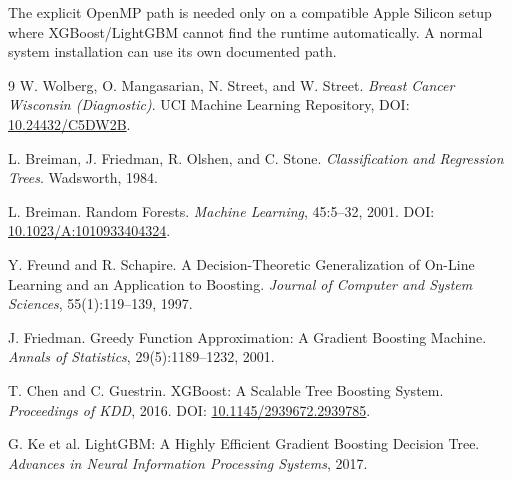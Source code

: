 \documentclass[11pt]{article}
\begin{document}
The explicit OpenMP path is needed only on a compatible Apple Silicon setup
where XGBoost/LightGBM cannot find the runtime automatically. A normal system
installation can use its own documented path.

\begin{thebibliography}{9}
W. Wolberg, O. Mangasarian, N. Street, and W. Street.
\emph{Breast Cancer Wisconsin (Diagnostic)}. UCI Machine Learning Repository,
DOI: \href{https://doi.org/10.24432/C5DW2B}{10.24432/C5DW2B}.

L. Breiman, J. Friedman, R. Olshen, and C. Stone.
\emph{Classification and Regression Trees}. Wadsworth, 1984.

L. Breiman. Random Forests. \emph{Machine Learning}, 45:5--32, 2001.
DOI: \href{https://doi.org/10.1023/A:1010933404324}{10.1023/A:1010933404324}.

Y. Freund and R. Schapire. A Decision-Theoretic Generalization of On-Line
Learning and an Application to Boosting. \emph{Journal of Computer and System
Sciences}, 55(1):119--139, 1997.

J. Friedman. Greedy Function Approximation: A Gradient Boosting Machine.
\emph{Annals of Statistics}, 29(5):1189--1232, 2001.

T. Chen and C. Guestrin. XGBoost: A Scalable Tree Boosting System.
\emph{Proceedings of KDD}, 2016. DOI:
\href{https://doi.org/10.1145/2939672.2939785}{10.1145/2939672.2939785}.

G. Ke et al. LightGBM: A Highly Efficient Gradient Boosting Decision Tree.
\emph{Advances in Neural Information Processing Systems}, 2017.
\end{thebibliography}
\end{document}
